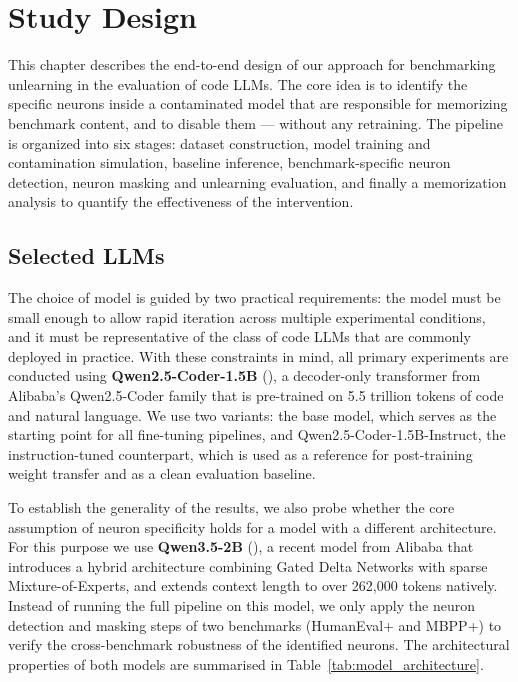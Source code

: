\documentclass[mscthesis]{usiinfthesis}
\begin{document}
\chapter{Study Design}
This chapter describes the end-to-end design of our approach for benchmarking unlearning in the evaluation of code LLMs. The core idea is to identify the specific neurons inside a contaminated model that are responsible for memorizing benchmark content, and to disable them — without any retraining. The pipeline is organized into six stages: dataset construction, model training and contamination simulation, baseline inference, benchmark-specific neuron detection, neuron masking and unlearning evaluation, and finally a memorization analysis to quantify the effectiveness of the intervention.

\section{Selected LLMs}
\label{sec:selected_llms}
The choice of model is guided by two practical requirements: the model must be small enough
to allow rapid iteration across multiple experimental conditions, and it must be representative
of the class of code LLMs that are commonly deployed in practice. With these constraints in
mind, all primary experiments are conducted using \textbf{Qwen2.5-Coder-1.5B}
(\citet{hui2024qwen25codertechnicalreport}), a decoder-only transformer from Alibaba's
Qwen2.5-Coder family that is pre-trained on 5.5 trillion tokens of code and natural language.
We use two variants: the base model, which serves as the starting point for all fine-tuning
pipelines, and Qwen2.5-Coder-1.5B-Instruct, the instruction-tuned counterpart, which
is used as a reference for post-training weight transfer and as a clean evaluation baseline.
\par\vspace{1em}
To establish the generality of the results, we also probe whether the core assumption of neuron specificity holds
for a model with a different architecture. For this purpose we use
\textbf{Qwen3.5-2B} (\citet{qwen3.5}), a recent model from Alibaba that introduces a hybrid
architecture combining Gated Delta Networks with sparse Mixture-of-Experts, and extends
context length to over 262,000 tokens natively. 
Instead of running the full pipeline on this model, we only apply the neuron detection and masking steps of two benchmarks (HumanEval+ and MBPP+) to verify the cross-benchmark robustness of the identified neurons.
The architectural properties of both models are summarised in Table~\ref{tab:model_architecture}.
\end{document}
